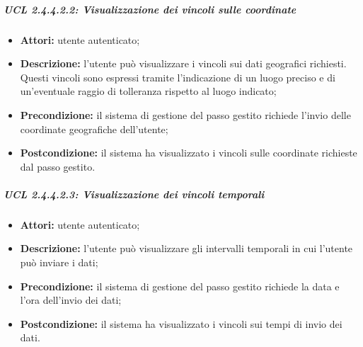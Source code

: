 \subparagraph{UCL 2.4.4.2.2: Visualizzazione dei vincoli sulle coordinate}
\begin{itemize}
\item \textbf{Attori:} utente autenticato;
\item \textbf{Descrizione:} l'utente può visualizzare i vincoli sui dati geografici richiesti. Questi vincoli sono espressi tramite l'indicazione di un luogo preciso e di un'eventuale raggio di tolleranza rispetto al luogo indicato;
\item \textbf{Precondizione:} il sistema di gestione del passo gestito richiede l'invio delle coordinate geografiche dell'utente;
\item \textbf{Postcondizione:} il sistema ha visualizzato i vincoli sulle coordinate richieste dal passo gestito.
\end{itemize}

\subparagraph{UCL 2.4.4.2.3: Visualizzazione dei vincoli temporali}
\begin{itemize}
\item \textbf{Attori:} utente autenticato;
\item \textbf{Descrizione:} l'utente può visualizzare gli intervalli temporali in cui l'utente può inviare i dati;
\item \textbf{Precondizione:} il sistema di gestione del passo gestito richiede la data e l'ora dell'invio dei dati;
\item \textbf{Postcondizione:} il sistema ha visualizzato i vincoli sui tempi di invio dei dati.
\end{itemize}

